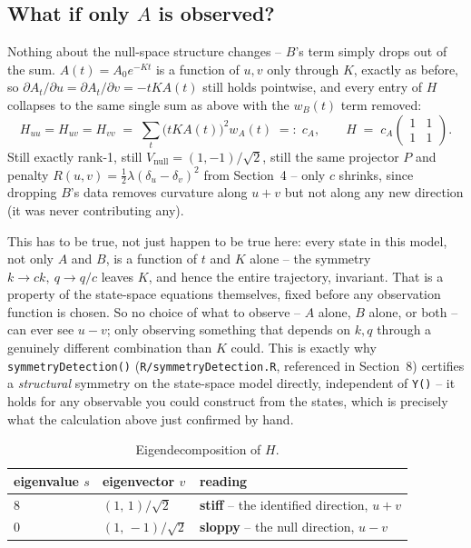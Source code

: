 \documentclass[11pt]{article}
\newcommand{\code}[1]{\texttt{#1}}
\newcommand{\file}[1]{\textcolor{black!60}{\texttt{#1}}}
\newcommand{\stiff}[1]{\textcolor{stiffcol}{\textbf{#1}}}
\newcommand{\slop}[1]{\textcolor{sloppycol}{\textbf{#1}}}
\begin{document}
\subsection*{What if only $A$ is observed?}

Nothing about the null-space structure changes -- $B$'s term simply drops out
of the sum. $A(t)=A_0e^{-Kt}$ is a function of $u,v$ only through $K$, exactly
as before, so $\partial A_t/\partial u=\partial A_t/\partial v=-tKA(t)$ still
holds pointwise, and every entry of $H$ collapses to the same single sum as
above with the $w_B(t)$ term removed:
\begin{equation}
  H_{uu}=H_{uv}=H_{vv} \;=\; \sum_t\big(tKA(t)\big)^2w_A(t) \;=:\; c_A,
  \qquad H \;=\; c_A\begin{pmatrix}1&1\\1&1\end{pmatrix}.
\end{equation}
Still exactly rank-1, still $V_{\mathrm{null}}=(1,-1)/\sqrt2$, still the same
projector $P$ and penalty $R(u,v)=\tfrac12\lambda(\delta_u-\delta_v)^2$ from
Section~4 -- only $c$ shrinks, since dropping $B$'s data removes curvature
along $u+v$ but not along any new direction (it was never contributing any).

This has to be true, not just happen to be true here: every state in this
model, not only $A$ and $B$, is a function of $t$ and $K$ alone -- the
symmetry $k\to ck,\ q\to q/c$ leaves $K$, and hence the entire trajectory,
invariant. That is a property of the state-space equations themselves, fixed
before any observation function is chosen. So no choice of what to
observe -- $A$ alone, $B$ alone, or both -- can ever see $u-v$; only observing
something that depends on $k,q$ through a genuinely different combination
than $K$ could. This is exactly why \code{symmetryDetection()}
(\file{R/symmetryDetection.R}, referenced in Section~8) certifies a
\emph{structural} symmetry on the state-space model directly, independent of
\code{Y()} -- it holds for any observable you could construct from the
states, which is precisely what the calculation above just confirmed by hand.

\begin{table}[h]
\centering
\begin{tabular}{@{}lll@{}}
\toprule
eigenvalue $s$ & eigenvector $v$ & reading \\
\midrule
$8$ & $(1,\,1)/\sqrt{2}$ & \stiff{stiff} -- the identified direction, $u+v$ \\
$0$ & $(1,\,-1)/\sqrt{2}$ & \slop{sloppy} -- the null direction, $u-v$ \\
\bottomrule
\end{tabular}
\caption{Eigendecomposition of $H$.}
\end{table}
\end{document}
